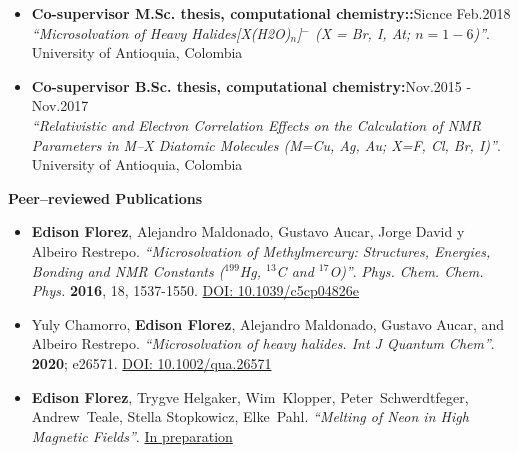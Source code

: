 \documentclass[12pt]{extarticle}
\begin{document}
\begin{itemize}
 \item {\bf Co-supervisor M.Sc. thesis, computational chemistry::}\hfill \textcolor{azul}{Sicnce Feb.2018}\\
 \emph{``Microsolvation of Heavy Halides[X(H2O)$_n$]$^-$ (X = Br, I, At; $n=1-6$)''}. \\
 University of Antioquia, Colombia
 
 \item {\bf Co-supervisor B.Sc. thesis, computational chemistry:}\hfill \textcolor{azul}{Nov.2015 - Nov.2017}\\
 \emph{``Relativistic and Electron Correlation Effects on the Calculation of NMR Parameters in M--X Diatomic Molecules (M=Cu, Ag, Au; X=F, Cl, Br, I)''}.\\
 University of Antioquia, Colombia
\end{itemize}



{\bf\Large Peer--reviewed \textcolor{azul}{Publications}}\\ \vspace*{-6mm}

\begin{itemize}

  \item {\bf Edison Florez}, Alejandro Maldonado, Gustavo Aucar, Jorge David y Albeiro Restrepo. \emph{``Microsolvation of Methylmercury: Structures, Energies, Bonding and NMR Constants ($^{199}$Hg, $^{13}$C and $^{17}$O)''}. {\em Phys. Chem. Chem. Phys.} {\bf 2016}, 18, 1537-1550. \underline{DOI: 10.1039/c5cp04826e}

  \item Yuly Chamorro, {\bf Edison Florez}, Alejandro Maldonado, Gustavo Aucar, and Albeiro Restrepo. \emph{``Microsolvation of heavy halides. Int J Quantum Chem''}. {\bf 2020}; e26571. \underline{DOI: 10.1002/qua.26571}

  \item {\bf Edison Florez}, Trygve Helgaker, Wim~Klopper, Peter~Schwerdtfeger, Andrew~Teale, Stella Stopkowicz, Elke~Pahl. \emph{``Melting of Neon in High Magnetic Fields''}. \underline{In preparation}  

  
\end{itemize}
\end{document}
